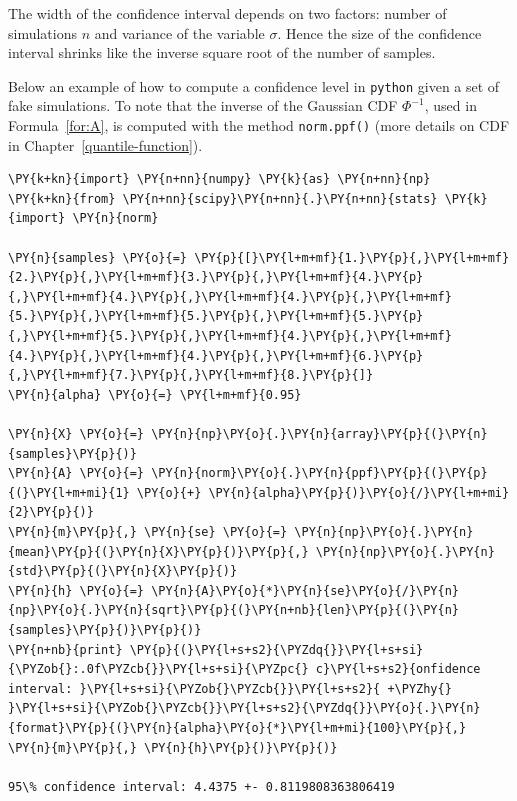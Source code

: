 The width of the confidence interval depends on two factors: number of simulations $n$ and variance of the variable $\sigma$. Hence the size of the confidence interval shrinks like the inverse square root of the number of samples. %

Below an example of how to compute a confidence level in \texttt{python} given a set of fake simulations. To note that the inverse of the Gaussian CDF $\Phi^{-1}$, used in Formula~\ref{for:A}, is computed with the method \texttt{norm.ppf()} (more details on CDF in Chapter~\ref{quantile-function}).

\begin{tcolorbox}[breakable, size=fbox, boxrule=1pt, pad at break*=1mm,colback=cellbackground, colframe=cellborder]
\begin{Verbatim}[commandchars=\\\{\}]
\PY{k+kn}{import} \PY{n+nn}{numpy} \PY{k}{as} \PY{n+nn}{np}
\PY{k+kn}{from} \PY{n+nn}{scipy}\PY{n+nn}{.}\PY{n+nn}{stats} \PY{k}{import} \PY{n}{norm}

\PY{n}{samples} \PY{o}{=} \PY{p}{[}\PY{l+m+mf}{1.}\PY{p}{,}\PY{l+m+mf}{2.}\PY{p}{,}\PY{l+m+mf}{3.}\PY{p}{,}\PY{l+m+mf}{4.}\PY{p}{,}\PY{l+m+mf}{4.}\PY{p}{,}\PY{l+m+mf}{4.}\PY{p}{,}\PY{l+m+mf}{5.}\PY{p}{,}\PY{l+m+mf}{5.}\PY{p}{,}\PY{l+m+mf}{5.}\PY{p}{,}\PY{l+m+mf}{5.}\PY{p}{,}\PY{l+m+mf}{4.}\PY{p}{,}\PY{l+m+mf}{4.}\PY{p}{,}\PY{l+m+mf}{4.}\PY{p}{,}\PY{l+m+mf}{6.}\PY{p}{,}\PY{l+m+mf}{7.}\PY{p}{,}\PY{l+m+mf}{8.}\PY{p}{]}
\PY{n}{alpha} \PY{o}{=} \PY{l+m+mf}{0.95}

\PY{n}{X} \PY{o}{=} \PY{n}{np}\PY{o}{.}\PY{n}{array}\PY{p}{(}\PY{n}{samples}\PY{p}{)}
\PY{n}{A} \PY{o}{=} \PY{n}{norm}\PY{o}{.}\PY{n}{ppf}\PY{p}{(}\PY{p}{(}\PY{l+m+mi}{1} \PY{o}{+} \PY{n}{alpha}\PY{p}{)}\PY{o}{/}\PY{l+m+mi}{2}\PY{p}{)}
\PY{n}{m}\PY{p}{,} \PY{n}{se} \PY{o}{=} \PY{n}{np}\PY{o}{.}\PY{n}{mean}\PY{p}{(}\PY{n}{X}\PY{p}{)}\PY{p}{,} \PY{n}{np}\PY{o}{.}\PY{n}{std}\PY{p}{(}\PY{n}{X}\PY{p}{)}
\PY{n}{h} \PY{o}{=} \PY{n}{A}\PY{o}{*}\PY{n}{se}\PY{o}{/}\PY{n}{np}\PY{o}{.}\PY{n}{sqrt}\PY{p}{(}\PY{n+nb}{len}\PY{p}{(}\PY{n}{samples}\PY{p}{)}\PY{p}{)}
\PY{n+nb}{print} \PY{p}{(}\PY{l+s+s2}{\PYZdq{}}\PY{l+s+si}{\PYZob{}:.0f\PYZcb{}}\PY{l+s+si}{\PYZpc{} c}\PY{l+s+s2}{onfidence interval: }\PY{l+s+si}{\PYZob{}\PYZcb{}}\PY{l+s+s2}{ +\PYZhy{} }\PY{l+s+si}{\PYZob{}\PYZcb{}}\PY{l+s+s2}{\PYZdq{}}\PY{o}{.}\PY{n}{format}\PY{p}{(}\PY{n}{alpha}\PY{o}{*}\PY{l+m+mi}{100}\PY{p}{,} \PY{n}{m}\PY{p}{,} \PY{n}{h}\PY{p}{)}\PY{p}{)}

95\% confidence interval: 4.4375 +- 0.8119808363806419
\end{Verbatim}
\end{tcolorbox}
